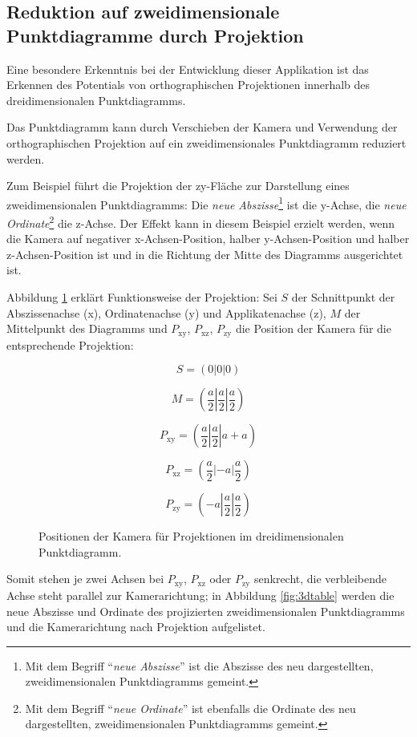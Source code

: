 \subsection{Reduktion auf zweidimensionale Punktdiagramme durch Projektion}

Eine besondere Erkenntnis bei der Entwicklung dieser Applikation ist das Erkennen des Potentials von orthographischen Projektionen innerhalb des dreidimensionalen Punktdiagramms.

Das Punktdiagramm kann durch Verschieben der Kamera und Verwendung der orthographischen Projektion auf ein zweidimensionales Punktdiagramm reduziert werden.

Zum Beispiel führt die Projektion der zy-Fläche zur Darstellung eines zweidimensionalen Punktdiagramms: Die \textit{neue Abszisse}\footnote{Mit dem Begriff "`\textit{neue Abszisse}"' ist die Abszisse des neu dargestellten, zweidimensionalen Punktdiagramms gemeint.} ist die y-Achse, die \textit{neue Ordinate}\footnote{Mit dem Begriff "`\textit{neue Ordinate}"' ist ebenfalls die Ordinate des neu dargestellten, zweidimensionalen Punktdiagramms gemeint.} die z-Achse. Der Effekt kann in diesem Beispiel erzielt werden, wenn die Kamera auf negativer x-Achsen-Position, halber y-Achsen-Position und halber z-Achsen-Position ist und in die Richtung der Mitte des Diagramms ausgerichtet ist.

Abbildung \ref{fig:3dmath} erklärt Funktionsweise der Projektion: Sei $S$ der Schnittpunkt der Abszissenachse (x), Ordinatenachse (y) und Applikatenachse (z), $M$ der Mittelpunkt des Diagramms und $P_{\text{xy}}$, $P_{\text{xz}}$, $P_{\text{zy}}$ die Position der Kamera für die entsprechende Projektion:

\begin{figure}[H]
$$S = (0|0|0)$$

$$M = (\frac{a}{2} | \frac{a}{2} | \frac{a}{2})$$

$$P_{\text{xy}} = (\frac{a}{2} | \frac{a}{2}| a + a)$$

$$P_{\text{xz}} = (\frac{a}{2} | -a | \frac{a}{2})$$

$$P_{\text{zy}} = (-a | \frac{a}{2}| \frac{a}{2})$$

\caption{Positionen der Kamera für Projektionen im dreidimensionalen Punktdiagramm.}
\label{fig:3dmath}
\end{figure}

Somit stehen je zwei Achsen bei $P_{\text{xy}}$, $P_{\text{xz}}$ oder $P_{\text{zy}}$ senkrecht, die verbleibende Achse steht parallel zur Kamerarichtung; in Abbildung \ref{fig:3dtable} werden die neue Abszisse und Ordinate des projizierten zweidimensionalen Punktdiagramms und die Kamerarichtung nach Projektion aufgelistet.

